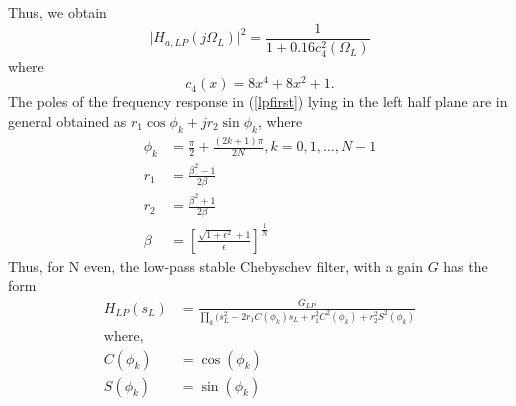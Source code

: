 \documentclass[journal,12pt,twocolumn]{IEEEtran}
\begin{document}
\begin{enumerate}
Thus, we obtain
\begin{equation}
\label{lpsqfinal}
\vert H_{a,LP}(j\Omega_L)\vert^2 = \frac{1}{1 + 0.16c_4^2(\Omega_L)}
\end{equation}
where
\begin{equation}
c_4(x) = 8x^4 + 8x^2 + 1.	
\end{equation}
The poles of the frequency response in (\ref{lpfirst}) lying in the left half plane are in general obtained as 
$r_1\cos\phi_k + jr_2\sin \phi_k$, where
\begin{align}
   \phi_k &= \frac{\pi}{2} + \frac{(2k+1)\pi}{2N}, k = 0, 1, \dots, N-1 \nonumber \\
r_1 &= \frac{\beta^2 - 1}{2\beta}\\
r_2 &= \frac{\beta^2 + 1}{2\beta}\\
\beta &= \left[ \frac{\sqrt{1 + \epsilon^2} + 1}{\epsilon}\right]^{\frac{1}{N}}
\end{align}
Thus, for N even, the low-pass stable Chebyschev filter, with a gain $G$ has the form
\begin{align}
\label{eq:poleleft}
H_{LP}(s_L) &= \frac{G_{LP}}{\prod_{k}^{}(s_L^2 - 2r_1 C(\phi_k)s_L + r_1^2C^2(\phi_k) + r_2^2 S^2(\phi_k)}\\
\text{where,}\\
C(\phi_k) &= \cos(\phi_k) \\
S(\phi_k) &= \sin(\phi_k)
\end{align}


\end{enumerate}
\end{document}
